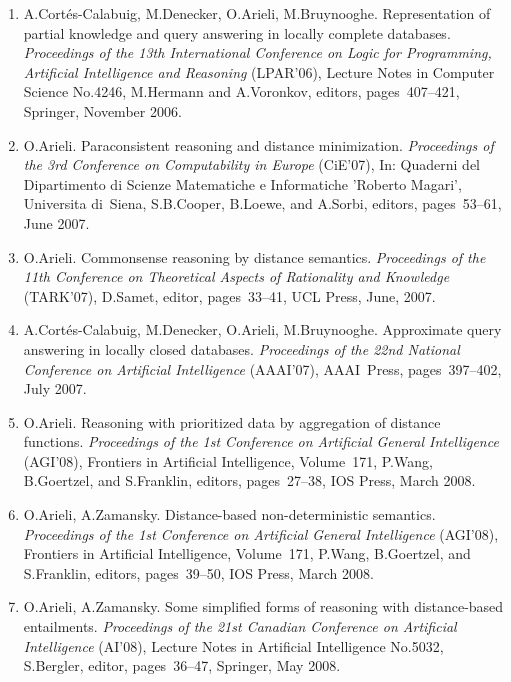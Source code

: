 \documentclass{article}
\begin{document}
\begin{enumerate}
   \item A.Cort\'es-Calabuig, M.Denecker, O.Arieli, M.Bruynooghe.
         Representation of partial knowledge and query answering in locally
         complete databases. {\em Proceedings of the 13th International Conference
         on Logic for Programming, Artificial Intelligence and Reasoning\/} (LPAR'06),
         Lecture Notes in Computer Science No.4246, M.Hermann and A.Voronkov, editors,
         pages~407--421, Springer, November 2006.

   \item O.Arieli.
         Paraconsistent reasoning and distance minimization. {\em Proceedings of the 3rd
         Conference on Computability in Europe\/} (CiE'07),
         In: Quaderni del Dipartimento di Scienze Matematiche e Informatiche
         'Roberto Magari', Universita  di~Siena, S.B.Cooper, B.Loewe, and A.Sorbi,
         editors, pages~53--61, June 2007.

   \item O.Arieli.
         Commonsense reasoning by distance semantics. {\em Proceedings of the 11th Conference
         on Theoretical Aspects of Rationality and Knowledge\/} (TARK'07),
         D.Samet, editor, pages~33--41, UCL Press, June, 2007.

   \item A.Cort\'es-Calabuig, M.Denecker, O.Arieli, M.Bruynooghe.
         Approximate query answering in locally closed databases.
         {\em Proceedings of the 22nd National Conference on Artificial Intelligence\/} (AAAI'07),
         AAAI~Press, pages~397--402, July 2007.

   \item O.Arieli.
         Reasoning with prioritized data by aggregation of distance functions.
         {\em Proceedings of the 1st Conference on Artificial General Intelligence\/} (AGI'08),
         Frontiers in Artificial Intelligence, Volume~171,
         P.Wang, B.Goertzel, and S.Franklin, editors, pages~27--38, IOS Press,
         March 2008.

   \item O.Arieli, A.Zamansky.
         Distance-based non-deterministic semantics.
         {\em Proceedings of the 1st Conference on Artificial General Intelligence\/} (AGI'08),
         Frontiers in Artificial Intelligence, Volume~171,
         P.Wang, B.Goertzel, and S.Franklin, editors, pages~39--50, IOS Press,
         March 2008.

   \item O.Arieli, A.Zamansky.
         Some simplified forms of reasoning with distance-based entailments.
         {\em Proceedings of the 21st Canadian Conference on Artificial Intelligence\/} (AI'08),
         Lecture Notes in Artificial Intelligence No.5032,
         S.Bergler, editor, pages~36--47, Springer, May 2008.


\end{enumerate}
\end{document}
